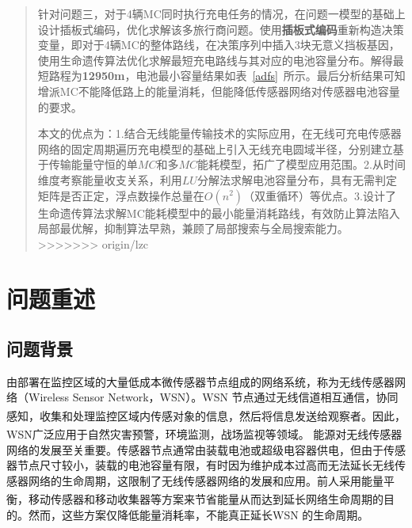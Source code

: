 \documentclass{whutmod}
\newcommand{\upcite}[1]{\textsuperscript{\cite{#1}}}
\begin{document}
\begin{abstract}
		针对问题三，对于4辆MC同时执行充电任务的情况，在问题一模型的基础上设计插板式编码，优化求解该多旅行商问题。使用\textbf{插板式编码}重新构造决策变量，即对于4辆MC的整体路线，在决策序列中插入$3$块无意义挡板基因，使用生命遗传算法优化求解最短充电路线与其对应的电池容量分布。解得最短路程为\textbf{12950m}，电池最小容量结果如表~\ref{adfs}~所示。最后分析结果可知增派MC不能降低路上的能量消耗，但能降低传感器网络对传感器电池容量的要求。
		
	
		本文的优点为：1.结合无线能量传输技术的实际应用，在无线可充电传感器网络的固定周期遍历充电模型的基础上引入无线充电圆域半径，分别建立基于传输能量守恒的单$MC$和多$MC$能耗模型，拓广了模型应用范围。2.从时间维度考察能量收支关系，利用$LU$分解法求解电池容量分布，具有无需判定矩阵是否正定，浮点数操作总量在$O(n^2)$（双重循环）等优点。3.设计了生命遗传算法求解MC能耗模型中的最小能量消耗路线，有效防止算法陷入局部最优解，抑制算法早熟，兼顾了局部搜索与全局搜索能力。
>>>>>>> origin/lzc
	\end{abstract}


	\thispagestyle{empty}
	\tableofcontents
	\setcounter{page}{0}                                               
	\newpage	%

	\section{问题重述}	
		\subsection{问题背景}
	    	由部署在监控区域的大量低成本微传感器节点组成的网络系统，称为无线传感器网络（Wireless Sensor Network，WSN）。WSN 节点通过无线信道相互通信，协同感知，收集和处理监控区域内传感对象的信息，然后将信息发送给观察者\upcite{1}。因此，WSN广泛应用于自然灾害预警，环境监测，战场监视等领域\upcite{2}。
	    	能源对无线传感器网络的发展至关重要。传感器节点通常由装载电池或超级电容器供电，但由于传感器节点尺寸较小，装载的电池容量有限，有时因为维护成本过高而无法延长无线传感器网络的生命周期，这限制了无线传感器网络的发展和应用。前人采用能量平衡\upcite{4,5}，移动传感器\upcite{6,7}和移动收集器等方案来节省能量从而达到延长网络生命周期的目的。然而，这些方案仅降低能量消耗率，不能真正延长WSN 的生命周期。
\end{document}
